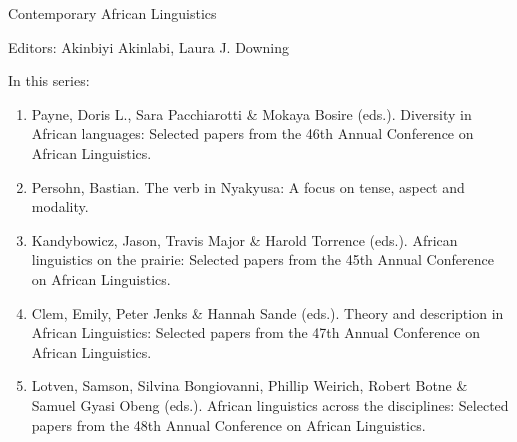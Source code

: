 {\large Contemporary African Linguistics}

\bigskip

Editors: Akinbiyi Akinlabi,  Laura J. Downing  


\bigskip

In this series:

\begin{enumerate}
\item Payne, Doris L., Sara Pacchiarotti \& Mokaya Bosire (eds.). Diversity in African languages: Selected papers from the 46th Annual Conference on African Linguistics.
\item Persohn, Bastian. The verb in Nyakyusa: A focus on tense, aspect and modality.
\item Kandybowicz, Jason, Travis Major \& Harold Torrence (eds.). African linguistics on the prairie: Selected papers from the 45th Annual Conference on African Linguistics.
\item Clem, Emily, Peter Jenks   \& Hannah Sande (eds.). Theory and description in African Linguistics: Selected papers from the 47th Annual Conference on African Linguistics.
\item Lotven, Samson, Silvina Bongiovanni, Phillip Weirich, Robert Botne \& Samuel Gyasi Obeng (eds.). African linguistics across the disciplines: Selected papers from the 48th Annual Conference on African Linguistics.
\end{enumerate}

\vfill

